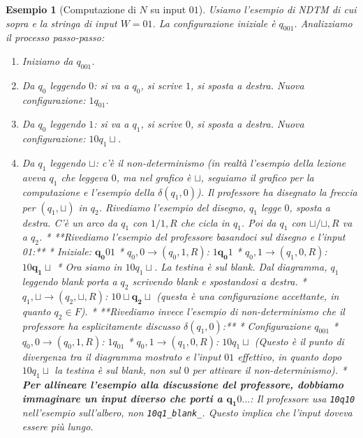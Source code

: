 \documentclass[a4paper, 11pt]{book} %
\newtheorem{example}[theorem]{Esempio}
\theoremstyle{definition}
\begin{document}
\begin{example}[Computazione di $N$ su input $01$]
Usiamo l'esempio di NDTM di cui sopra e la stringa di input $W = 01$.
La configurazione iniziale è $q_001$.
Analizziamo il processo passo-passo:
\begin{enumerate}
    \item Iniziamo da $q_001$.
    \item Da $q_0$ leggendo $0$: si va a $q_0$, si scrive $1$, si sposta a destra. Nuova configurazione: $1q_01$.
    \item Da $q_0$ leggendo $1$: si va a $q_1$, si scrive $0$, si sposta a destra. Nuova configurazione: $10q_1\sqcup$.
    \item Da $q_1$ leggendo $\sqcup$: c'è il non-determinismo (in realtà l'esempio della lezione aveva $q_1$ che leggeva $0$, ma nel grafico è $\sqcup$, seguiamo il grafico per la computazione e l'esempio della $\delta(q_1,0)$). Il professore ha disegnato la freccia per $(q_1, \sqcup)$ in $q_2$. Rivediamo l'esempio del disegno, $q_1$ legge $0$, sposta a destra. C'è un arco da $q_1$ con $1/1,R$ che cicla in $q_1$. Poi da $q_1$ con $\sqcup/\sqcup,R$ va a $q_2$.
    *   **Rivediamo l'esempio del professore basandoci sul disegno e l'input 01:**
        *   Iniziale: $\mathbf{q_0}01$
        *   $q_0,0 \to (q_0,1,R)$: $1\mathbf{q_0}1$
        *   $q_0,1 \to (q_1,0,R)$: $10\mathbf{q_1}\sqcup$
        *   Ora siamo in $10q_1\sqcup$. La testina è sul blank. Dal diagramma, $q_1$ leggendo blank porta a $q_2$ scrivendo blank e spostandosi a destra.
        *   $q_1,\sqcup \to (q_2,\sqcup,R)$: $10\sqcup\mathbf{q_2}\sqcup$ (questa è una configurazione accettante, in quanto $q_2 \in F$).
    *   **Rivediamo invece l'esempio di non-determinismo che il professore ha esplicitamente discusso $\delta(q_1,0)$:**
        *   Configurazione $q_001$
        *   $q_0,0 \to (q_0,1,R)$: $1q_01$
        *   $q_0,1 \to (q_1,0,R)$: $10q_1\sqcup$ (Questo è il punto di divergenza tra il diagramma mostrato e l'input $01$ effettivo, in quanto dopo $10q_1\sqcup$ la testina è sul blank, non sul $0$ per attivare il non-determinismo).
        *   \textbf{Per allineare l'esempio alla discussione del professore, dobbiamo immaginare un input diverso che porti a $\mathbf{q_1}0...$}: Il professore usa \texttt{10q10} nell'esempio sull'albero, non \texttt{10q1\_blank\_}. Questo implica che l'input doveva essere più lungo.

\end{enumerate}
\end{example}
\end{document}
